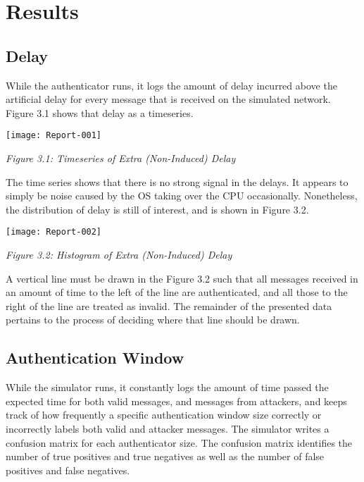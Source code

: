 \documentclass[12pt]{article}
\begin{document}
\section{Results}

\subsection{Delay}

While the authenticator runs, it logs the amount of delay incurred above the artificial delay for every message that is received on the simulated network. Figure 3.1 shows that delay as a timeseries.

\begin{center}
\texttt{[image: Report-001]}

\textit{Figure 3.1: Timeseries of Extra (Non-Induced) Delay}
\end{center}

The time series shows that there is no strong signal in the delays. It appears to simply be noise caused by the OS taking over the CPU occasionally. Nonetheless, the distribution of delay is still of interest, and is shown in Figure 3.2.

\begin{center}
\texttt{[image: Report-002]}

\textit{Figure 3.2: Histogram of Extra (Non-Induced) Delay}
\end{center}

A vertical line must be drawn in the Figure 3.2 such that all messages received in an amount of time to the left of the line are authenticated, and all those to the right of the line are treated as invalid. The remainder of the presented data pertains to the process of deciding where that line should be drawn.

\subsection{Authentication Window}

While the simulator runs, it constantly logs the amount of time passed the expected time for both valid messages, and messages from attackers, and keeps track of how frequently a specific authentication window size correctly or incorrectly labels both valid and attacker messages. The simulator writes a confusion matrix for each authenticator size. The confusion matrix identifies the number of true positives and true negatives as well as the number of false positives and false negatives.
\end{document}
